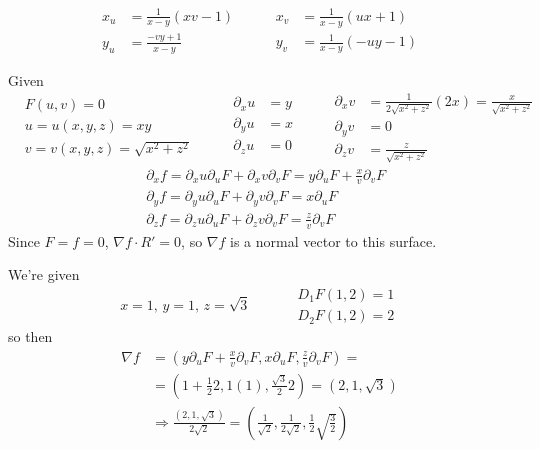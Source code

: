 \documentclass[twoside]{amsart}
\theoremstyle{plain}
\theoremstyle{definition}
\newcommand{\exercisehead}[1]
  {
   \noindent{\small\bf Exercise #1.}
   \smallskip}
\begin{document}
\[
\boxed{ \begin{aligned} x_u & = \frac{1}{x-y} (xv-1) \\ y_u & = \frac{-vy + 1 }{ x-y} \end{aligned} \quad \quad \, \begin{aligned} x_v & = \frac{1}{x-y} (ux +1) \\ y_v & = \frac{1}{x-y}(-uy - 1) \end{aligned} }
\]

\exercisehead{5}  Given 
\[
\begin{aligned}
  & F(u,v) = 0 \\
  & u = u(x,y,z) = xy \\ 
  & v = v(x,y,z) = \sqrt{ x^2 + z^2 }
\end{aligned} \quad \quad \,
\begin{aligned}
  \partial_x u & = y \\
 \partial_y u & = x \\
 \partial_z u & = 0 \\
\end{aligned}
\quad \quad \, 
\begin{aligned}
  \partial_x v & = \frac{ 1}{ 2 \sqrt{ x^2 + z^2 } } (2x) = \frac{x}{ \sqrt{ x^2 + z^2 }} \\
  \partial_y v & = 0 \\
  \partial_z v & = \frac{z}{ \sqrt{ x^2 + z^2 } }
\end{aligned}
\]
\[
\begin{aligned}
  & \partial_x f = \partial_x u \partial_u F + \partial_x v \partial_v F = y \partial_u F + \frac{x}{v} \partial_v F \\
  & \partial_y f = \partial_y u \partial_u F + \partial_y v \partial_v F = x \partial_u F  \\
  & \partial_z f = \partial_z u \partial_u F + \partial_z v \partial_v F = \frac{z}{v} \partial_v F 
\end{aligned}
\]
Since $F = f = 0$, $\nabla f \cdot R' = 0$, so $\nabla f$ is a normal vector to this surface.  

We're given
\[
x = 1 , \, y = 1 , \, z = \sqrt{3} \quad \quad \, 
\begin{aligned}
  & D_1 F(1,2) = 1 \\
  & D_2 F(1,2) = 2 
\end{aligned}
\]
so then
\[
\begin{aligned}
  \nabla f & = (y \partial_u F + \frac{x}{v} \partial_v F , x \partial_u F, \frac{z}{v} \partial_v F ) = \\
  & = (1 + \frac{1}{2} 2 , 1(1) , \frac{\sqrt{3}}{2} 2 ) =\boxed{ (2,1,\sqrt{3}) }  \\
  & \Longrightarrow \frac{ (2,1,\sqrt{3} ) }{ 2 \sqrt{2} } = \boxed{ \left( \frac{1}{\sqrt{2}} , \frac{1}{ 2 \sqrt{2}}, \frac{1}{2} \sqrt{ \frac{3}{2} } \right) }
\end{aligned}
\]
\end{document}
